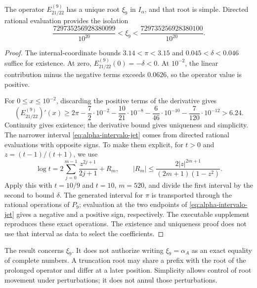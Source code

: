 \begin{proposition}
\label{prop:alpha-raiz-jet}
The operator \(E_{21/22}^{(9)}\) has a unique root
\(\xi_9\) in \(I_\alpha\), and that root is simple. Directed rational evaluation provides the isolation
\begin{equation}
 \frac{729735256928380099}{10^{20}}
 <\xi_9<\frac{729735256928380100}{10^{20}}.
 \label{eq:alpha-intervalo-jet}
\end{equation}
\end{proposition}

\begin{proof}
The internal-coordinate bounds
\(3.14<\pi<3.15\) and
\(0.045<\delta<0.046\) suffice for existence. At zero,
\(E_{21/22}^{(9)}(0)=-\delta<0\). At \(10^{-2}\), the linear
contribution minus the negative terms exceeds \(0.0626\), so the
operator value is positive.

For \(0\leq x\leq10^{-2}\), discarding the positive terms of
the derivative gives
\[
 (E_{21/22}^{(9)})'(x)
 \geq2\pi-\frac72\cdot10^{-2}
 -\frac{10}{21}\cdot10^{-8}-\frac6{46}\cdot10^{-10}
 -\frac7{120}\cdot10^{-12}>6.24.
\]
Continuity gives existence; the derivative bound gives uniqueness and
simplicity. The narrower interval
\eqref{eq:alpha-intervalo-jet} comes from directed rational evaluations
with opposite signs. To make them explicit, for \(t>0\) and
\(z=(t-1)/(t+1)\), we use
\[
 \log t=2\sum_{j=0}^{m-1}\frac{z^{2j+1}}{2j+1}+R_m,
 \qquad |R_m|\leq\frac{2|z|^{2m+1}}{(2m+1)(1-z^2)}.
\]
Apply this with \(t=10/9\) and \(t=10\), \(m=520\), and divide
the first interval by the second to bound \(\delta\). The generated
interval for \(\pi\) is transported through the rational operations of
\(P_9\); evaluation at the two endpoints of
\eqref{eq:alpha-intervalo-jet} gives a negative and a positive sign,
respectively. The executable supplement reproduces these exact operations.
The existence and uniqueness proof does not use that interval as data
to select the coefficients.
\end{proof}

The result concerns \(\xi_9\). It does not authorize writing
\(\xi_9=\alpha_A\) as an exact equality of complete numbers.
A truncation root may share a prefix with the root of the
prolonged operator and differ at a later position. Simplicity
allows control of root movement under perturbations; it does not
annul those perturbations.



